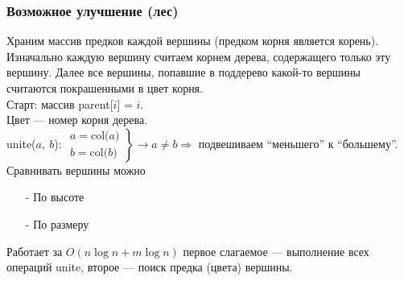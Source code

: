 \documentclass[12pt, a4paper]{article}
\begin{document}
    \subsubsection*{Возможное улучшение (лес)}
    Храним массив предков каждой вершины (предком корня является корень). Изначально каждую вершину считаем корнем дерева, содержащего только эту вершину. Далее все вершины, попавшие в поддерево какой-то вершины считаются покрашенными в цвет корня.\\
    Старт: массив parent[$i$] = $i$.\\
    Цвет --- номер корня дерева.\\
    unite($a,\ b$): $\left.\begin{matrix}
        a = \text{col($a$)}\\
        b = \text{col($b$)}
    \end{matrix}\right\}\rightarrow a\neq b\Rightarrow$ подвешиваем ``меньшего'' к ``большему''.\\
    Сравнивать вершины можно
    \begin{itemize}
        \item[-] По высоте
        \item[-] По размеру 
    \end{itemize}
    Работает за $O(n\log n + m\log n)$ первое слагаемое --- выполнение всех операций unite, второе --- поиск предка (цвета) вершины.
\end{document}
